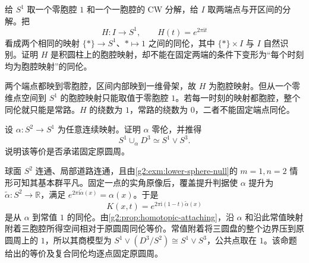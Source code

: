 \begin{exercise}\label{g2:ex:cellular-cylinder-slices}
	给 \(S^1\) 取一个零胞腔 \(1\) 和一个一胞腔的 CW 分解，给 \(I\) 取两端点与开区间的分解。把
	\[
		H:I\to S^1,\qquad H(t)=e^{2\pi\mathrm{i}t}
	\]
	看成两个相同的映射 \(\{*\}\to S^1\)、\(*\mapsto1\) 之间的同伦，其中 \(\{*\}\times I\) 与 \(I\) 自然识别。证明 \(H\) 是积圆柱上的胞腔映射，却不能在固定两端的条件下变形为“每个时刻均为胞腔映射”的同伦。
\end{exercise}
\begin{solution}
	两个端点都映到零胞腔，区间内部映到一维骨架，故 \(H\) 为胞腔映射。但从一个零维点空间到 \(S^1\) 的胞腔映射只能取值于零胞腔 \(1\)。若每一时刻的映射都胞腔，整个同伦就只能是常路。\(H\) 的绕数为 \(1\)，常路的绕数为 \(0\)，二者不能固定端点同伦。
\end{solution}

\begin{exercise}\label{g2:ex:attach-three-cell-to-circle}
	设 \(\alpha:S^2\to S^1\) 为任意连续映射。证明 \(\alpha\) 零伦，并推得
	\[
		S^1\cup_\alpha D^3\simeq S^1\vee S^3.
	\]
	说明该等价是否承诺固定原圆周。
\end{exercise}
\begin{solution}
	球面 \(S^2\) 连通、局部道路连通，且由\cref{g2:exm:lower-sphere-null}的 \(m=1,n=2\) 情形可知其基本群平凡。固定一点的实角原像后，覆盖提升判据使 \(\alpha\) 提升为 \(\widetilde\alpha:S^2\to\mathbb R\)，满足 \(e^{2\pi\mathrm{i}\widetilde\alpha(x)}=\alpha(x)\)。于是
	\[
		K(x,t)=e^{2\pi\mathrm{i}(1-t)\widetilde\alpha(x)}
	\]
	是从 \(\alpha\) 到常值 \(1\) 的同伦。由\cref{g2:prop:homotopic-attaching}，沿 \(\alpha\) 和沿此常值映射附着三胞腔所得空间相对于原圆周同伦等价。常值附着将三圆盘的整个边界压到原圆周上的 \(1\)，所以其商模型为 \(S^1\vee(D^3/S^2)\cong S^1\vee S^3\)，公共点取在 \(1\)。该命题给出的等价及复合同伦均逐点固定原圆周。
\end{solution}
